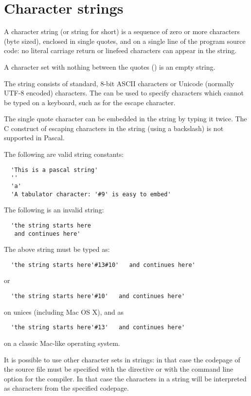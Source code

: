 \section{Character strings}
A character string (or string for short) is a sequence of zero or more
characters (byte sized), enclosed in single quotes, and on a single 
line of the program source code: no literal carriage return or linefeed 
characters can appear in the string.

A character set with nothing between the quotes () is an empty string.

The string consists of standard, 8-bit ASCII characters or Unicode (normally
UTF-8 encoded) characters. The  can be used to specify 
characters which cannot be typed on a keyboard, such as  for 
the escape character. 

The single quote character can be embedded in the string by typing it twice. 
The C construct of escaping characters in the string (using a backslash) 
is not supported in Pascal.

The following are valid string constants:
\begin{verbatim}
  'This is a pascal string'
  ''
  'a'
  'A tabulator character: '#9' is easy to embed'
\end{verbatim}
The following is an invalid string:
\begin{verbatim}
  'the string starts here
   and continues here'
\end{verbatim}
The above string must be typed as:
\begin{verbatim}
  'the string starts here'#13#10'   and continues here'
\end{verbatim}
or
\begin{verbatim}
  'the string starts here'#10'   and continues here'
\end{verbatim}
on unices (including Mac OS X), and as
\begin{verbatim}
  'the string starts here'#13'   and continues here'
\end{verbatim}
on a classic Mac-like operating system.
 
It is possible to use other character sets in strings: in that case the 
codepage of the source file must be specified with the 
directive or with the  command line option for the compiler. In that
case the characters in a string will be interpreted as characters from the
specified codepage.

